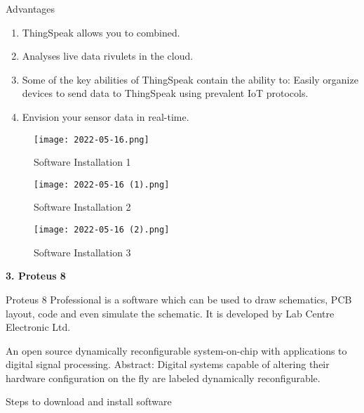\documentclass[12pt,a4paper]{report}
\begin{document}
\noindent Advantages 

\begin{enumerate}
\item  ThingSpeak allows you to combined.

\item  Analyses live data rivulets in the cloud.

\item  Some of the key abilities of ThingSpeak contain the ability to: Easily organize devices to send data to ThingSpeak using prevalent IoT protocols.

\item  Envision your sensor data in real-time.
\end{enumerate}

\noindent
\begin{figure}[htp]
    \texttt{[image: 2022-05-16.png]}
    \caption{Software Installation 1}
\end{figure}

\begin{figure}[htp]
    \texttt{[image: 2022-05-16 (1).png]}
    \caption{Software Installation 2}
\end{figure}

\noindent 
\begin{figure}[htp]
    \texttt{[image: 2022-05-16 (2).png]}
    \caption{Software Installation 3}
\end{figure}

\noindent 

\noindent 

\noindent 
                                                          
\newpage
\noindent \textbf{3. Proteus 8}


\noindent 

\noindent Proteus 8 Professional is a software which can be used to draw schematics, PCB layout, code and even simulate the schematic. It is developed by Lab Centre Electronic Ltd.

\noindent An open source dynamically reconfigurable system-on-chip with applications to digital signal processing. Abstract: Digital systems capable of altering their hardware configuration on the fly are labeled dynamically reconfigurable.

\noindent 

\noindent Steps to download and install software 

\noindent 
\end{document}
